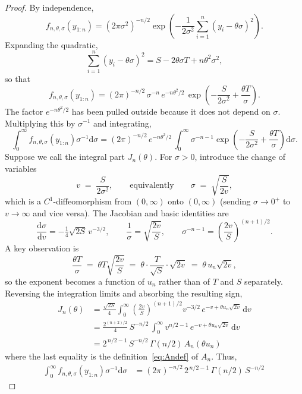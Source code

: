 \documentclass[12pt, a4paper]{report}
\newcommand{\diff}{\mathrm{d}}
\newcommand{\1}{\mathbf{1}}
\begin{document}
\begin{proof}
By independence,
\[
f_{n,\theta,\sigma}(y_{1:n})
= (2\pi\sigma^{2})^{-n/2}\exp\!\left(
   -\frac{1}{2\sigma^{2}}\sum_{i=1}^{n}(y_i-\theta\sigma)^{2}\right).
\]
Expanding the quadratic,
\[
\sum_{i=1}^{n}(y_i-\theta\sigma)^{2}
= S - 2\theta\sigma T + n\theta^{2}\sigma^{2},
\]
so that
\[
f_{n,\theta,\sigma}(y_{1:n})
= (2\pi)^{-n/2}\,\sigma^{-n}\,
  e^{-n\theta^{2}/2}\,
  \exp\!\left(-\frac{S}{2\sigma^{2}} + \frac{\theta T}{\sigma}\right).
\]
The factor $e^{-n\theta^{2}/2}$ has been pulled outside because it does not depend on $\sigma$. Multiplying this by $\sigma^{-1}$ and integrating,
\begin{equation}
\label{eq:Ipre}
\int_{0}^{\infty}\! f_{n,\theta,\sigma}(y_{1:n})\sigma^{-1}\diff\sigma
= (2\pi)^{-n/2}\,e^{-n\theta^{2}/2}\,
\int_{0}^{\infty}\!\sigma^{-n-1}
   \exp\!\left(-\frac{S}{2\sigma^{2}}+\frac{\theta T}{\sigma}\right)\diff\sigma.
\end{equation}
Suppose we call the integral part $J_n(\theta)$. For $\sigma>0$, introduce the change of variables
\[
v \;=\; \frac{S}{2\sigma^{2}},
\qquad\text{equivalently}\qquad
\sigma \;=\; \sqrt{\frac{S}{2v}},
\]
which is a $C^{1}$-diffeomorphism from $(0,\infty)$ onto $(0,\infty)$ (sending
$\sigma\to 0^{+}$ to $v\to\infty$ and vice versa). The Jacobian and basic
identities are
\[
\frac{\diff\sigma}{\diff v}
= -\tfrac{1}{4}\sqrt{2S}\,v^{-3/2},
\qquad
\frac{1}{\sigma}=\sqrt{\frac{2v}{S}},
\qquad
\sigma^{-n-1}=\left(\frac{2v}{S}\right)^{(n+1)/2}.
\]
A key observation is
\[
\frac{\theta T}{\sigma}
\;=\;\theta T\sqrt{\frac{2v}{S}}
\;=\;\theta \cdot \frac{T}{\sqrt{S}}\cdot \sqrt{2v}
\;=\;\theta\, u_n \sqrt{2v},
\]
so the exponent becomes a function of $u_n$ rather than of $T$ and $S$
separately. Reversing the integration limits and absorbing the resulting
sign,
\begin{align*}
J_n(\theta)
& = \frac{\sqrt{2S}}{4}
\int_{0}^{\infty}\!\left(\frac{2v}{S}\right)^{\!(n+1)/2}\! v^{-3/2}\,
e^{-v + \theta u_n\sqrt{2v}}\,\diff v\\
& = \frac{2^{(n+2)/2}}{4}\, S^{-n/2}\,
   \int_{0}^{\infty}\! v^{n/2-1}\,
   e^{-v + \theta u_n\sqrt{2v}}\,\diff v\\
& = 2^{\,n/2-1}\, S^{-n/2}\, \Gamma(n/2)\, A_n(\theta u_n)
\end{align*}
where the last equality is the definition~\eqref{eq:Andef} of $A_n$. Thus,
\begin{align*}
\int_{0}^{\infty} f_{n,\theta,\sigma}(y_{1:n})\sigma^{-1}\diff\sigma
&= (2\pi)^{-n/2}\,2^{\,n/2-1}\,\Gamma(n/2)\,S^{-n/2}\,

\end{align*}
\end{proof}
\end{document}
